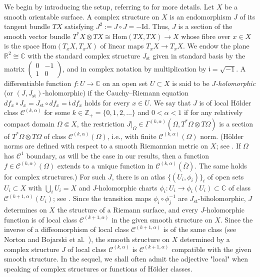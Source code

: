 \documentclass[11pt]{amsart}
\numberwithin{equation}{section}
\theoremstyle{definition}
\newcommand\Cscr{\mathscr{C}}
\newcommand\C{\mathbb{C}}
\newcommand\R{\mathbb{R}}
\newcommand\Z{\mathbb{Z}}
\newcommand\igot{\mathfrak{i}}
\renewcommand\igot{\mathfrak{i}}
\renewcommand\imath{\igot}
\newcommand\Id{\mathrm{Id}}
\def\Jst{J_{\mathrm{st}}}
\newcommand\Hom{\mathrm{Hom}}
\begin{document}
We begin by introducing the setup, referring
to \cite{Forstneric2024Runge} for more details.
Let $X$ be a smooth orientable surface.
A complex structure on $X$ is an endomorphism $J$ of its tangent bundle 
$TX$ satisfying $J^2:=J\circ J = -\Id$. Thus, $J$ is a section of the smooth 
vector bundle $T^*X\otimes TX\cong \Hom(TX,TX) \to X$ whose fibre over 
$x\in X$ is the space $\Hom(T_xX,T_xX)$ of linear maps $T_x X\to T_xX$.
We endow the plane $\R^2\cong \C$ with the standard complex
structure $\Jst$ given in standard basis by the matrix
$\left(\begin{smallmatrix} 0 & -1\\ 1 & 0\end{smallmatrix}\right)$, 
and in complex notation by multiplication by $\imath=\sqrt{-1}$.  
A differentiable function $f:U\to\C$ on an open set $U\subset X$ 
is said to be {\em $J$-holomorphic} (or $(J,\Jst)$-holomorphic) 
if the Cauchy--Riemann equation 
$df_x \circ J_x = \Jst \circ df_x=\imath\, df_x$ holds 
for every $x\in U$. We say that $J$ is of local H\"older class 
$\Cscr^{(k,\alpha)}$ for some $k\in\Z_+=\{0,1,2,\ldots\}$ and $0<\alpha<1$
if for any relatively compact domain $\Omega\Subset X$, the restriction
$J|_\Omega\in \Gamma^{(k,\alpha)}(\Omega,T^*\Omega\otimes T\Omega)$ 
is a section of $T^*\Omega\otimes T\Omega$ of class 
$\Cscr^{(k,\alpha)}(\Omega)$, i.e., with finite $\Cscr^{(k,\alpha)}(\Omega)$
norm. (H\"older norms are defined 
with respect to a smooth Riemannian metric on $X$;
see \cite[Sect. 4.1]{GilbargTrudinger1983}.
If $\Omega$ has $\Cscr^1$ boundary, as will be the case 
in our results, then a function $f\in \Cscr^{(k,\alpha)}(\Omega)$
extends to a unique function in $\Cscr^{(k,\alpha)}(\overline\Omega)$.
The same holds for complex structures.) 
For such $J$, there is an atlas $\{(U_i,\phi_i)\}_i$ of 
open sets $U_i\subset X$ with $\bigcup_{i} U_i=X$ and 
$J$-holomorphic charts $\phi_i :U_i \to \phi_i(U_i)\subset \C$ 
of class $\Cscr^{(k+1,\alpha)}(U_i)$; 
see \cite[Theorem 5.3.4]{AstalaIwaniecMartin2009}. 
Since the transition maps $\phi_i\circ\phi_j^{-1}$
are $\Jst$-biholomorphic, 
$J$ determines on $X$ the structure of a Riemann surface,  
and every $J$-holomorphic function is of local class $\Cscr^{(k+1,\alpha)}$
in the given smooth structure on $X$. Since the inverse
of a diffeomorphism of local class $\Cscr^{(k+1,\alpha)}$
is of the same class (see Norton \cite{Norton1986} and 
Bojarski et al.\ \cite[Theorem 2.1]{BojarskiAll2005}), 
the smooth structure on $X$ determined by a complex structure $J$ 
of local class $\Cscr^{(k,\alpha)}$ is $\Cscr^{(k+1,\alpha)}$ compatible 
with the given smooth structure. In the sequel, we shall often admit
the adjective "local" when speaking of complex structures or functions of
H\"older classes. 
\end{document}
